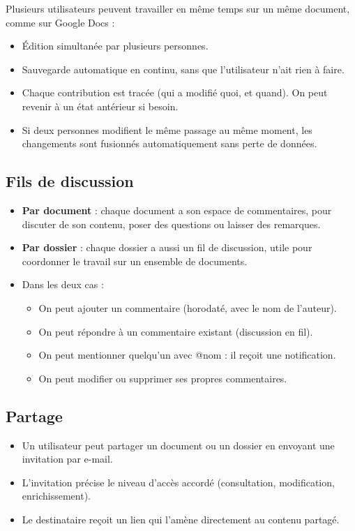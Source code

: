 \documentclass[a4paper,12pt,french]{article}
\begin{document}
Plusieurs utilisateurs peuvent travailler en même temps sur un même document, comme sur Google Docs :

\begin{itemize}[leftmargin=1.5em]
  \item Édition simultanée par plusieurs personnes.
  \item Sauvegarde automatique en continu, sans que l'utilisateur n'ait rien à faire.
  \item Chaque contribution est tracée (qui a modifié quoi, et quand). On peut revenir à un état antérieur si besoin.
  \item Si deux personnes modifient le même passage au même moment, les changements sont fusionnés automatiquement sans perte de données.
\end{itemize}

\subsection{Fils de discussion}

\begin{itemize}[leftmargin=1.5em]
  \item \textbf{Par document} : chaque document a son espace de commentaires, pour discuter de son contenu, poser des questions ou laisser des remarques.
  \item \textbf{Par dossier} : chaque dossier a aussi un fil de discussion, utile pour coordonner le travail sur un ensemble de documents.
  \item Dans les deux cas :
    \begin{itemize}
      \item On peut ajouter un commentaire (horodaté, avec le nom de l'auteur).
      \item On peut répondre à un commentaire existant (discussion en fil).
      \item On peut mentionner quelqu'un avec @nom : il reçoit une notification.
      \item On peut modifier ou supprimer ses propres commentaires.
    \end{itemize}
\end{itemize}

\subsection{Partage}

\begin{itemize}[leftmargin=1.5em]
  \item Un utilisateur peut partager un document ou un dossier en envoyant une invitation par e-mail.
  \item L'invitation précise le niveau d'accès accordé (consultation, modification, enrichissement).
  \item Le destinataire reçoit un lien qui l'amène directement au contenu partagé.
\end{itemize}
\end{document}
